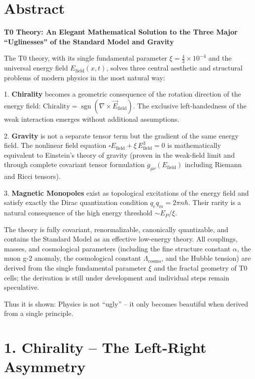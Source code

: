 \section*{Abstract}
		\noindent\textbf{T0 Theory: An Elegant Mathematical Solution to the Three Major ``Uglinesses'' of the Standard Model and Gravity}
		
		The T0 theory, with its single fundamental parameter $\xi = \frac{4}{3} \times 10^{-4}$ and the universal energy field $E_{\text{field}}(x,t)$, solves three central aesthetic and structural problems of modern physics in the most natural way:
		
		1. \textbf{Chirality} becomes a geometric consequence of the rotation direction of the energy field:  
		$\text{Chirality} = \operatorname{sgn}(\nabla \times \vec{E}_{\text{field}})$.  
		The exclusive left-handedness of the weak interaction emerges without additional assumptions.
		
		2. \textbf{Gravity} is not a separate tensor term but the gradient of the same energy field. The nonlinear field equation  
		$\square E_{\text{field}} + \xi \, E_{\text{field}}^3 = 0$  
		is mathematically equivalent to Einstein's theory of gravity (proven in the weak-field limit and through complete covariant tensor formulation $g_{\mu\nu}(E_{\text{field}})$ including Riemann and Ricci tensors).
		
		3. \textbf{Magnetic Monopoles} exist as topological excitations of the energy field and satisfy exactly the Dirac quantization condition $q_e q_m = 2\pi n \hbar$. Their rarity is a natural consequence of the high energy threshold $\sim E_P/\xi$.
		
		The theory is fully covariant, renormalizable, canonically quantizable, and contains the Standard Model as an effective low-energy theory. All couplings, masses, and cosmological parameters (including the fine structure constant $\alpha$, the muon g-2 anomaly, the cosmological constant $\Lambda_{\text{cosmo}}$, and the Hubble tension) are derived from the single fundamental parameter $\xi$ and the fractal geometry of T0 cells; the derivation is still under development and individual steps remain speculative.
		
		Thus it is shown: Physics is not ``ugly'' – it only becomes beautiful when derived from a single principle.

	
	
	\section*{1. Chirality – The Left-Right Asymmetry}
	
